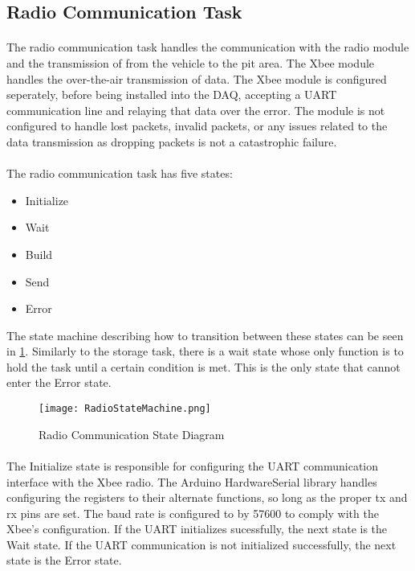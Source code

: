 \subsection{Radio Communication Task}

\paragraph{}
The radio communication task handles the communication with the radio module and the transmission of from the vehicle to the pit area.
The Xbee module handles the over-the-air transmission of data.
The Xbee module is configured seperately, before being installed into the DAQ, accepting a UART communication line and relaying that data over the error.
The module is not configured to handle lost packets, invalid packets, or any issues related to the data transmission as dropping packets is not a catastrophic failure.

\paragraph{}
The radio communication task has five states:
\begin{itemize}
	\item Initialize
	\item Wait
	\item Build
	\item Send
	\item Error
\end{itemize}
The state machine describing how to transition between these states can be seen in \cref{fig:RadioDiagram}.
Similarly to the storage task, there is a wait state whose only function is to hold the task until a certain condition is met.
This is the only state that cannot enter the Error state.

\begin{figure}[H]
	\centering
	\texttt{[image: RadioStateMachine.png]}
	\caption{Radio Communication State Diagram}
	\label{fig:RadioDiagram}
\end{figure}

\paragraph{}
The Initialize state is responsible for configuring the UART communication interface with the Xbee radio.
The Arduino HardwareSerial library handles configuring the registers to their alternate functions, so long as the proper tx and rx pins are set.
The baud rate is configured to by 57600 to comply with the Xbee's configuration.
If the UART initializes sucessfully, the next state is the Wait state.
If the UART communication is not initialized successfully, the next state is the Error state.


